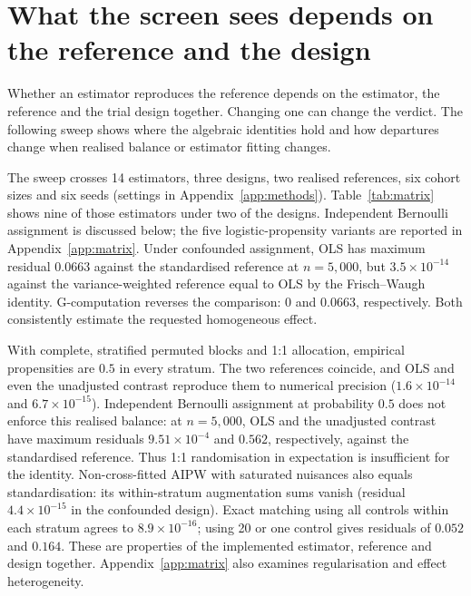\section{What the screen sees depends on the reference and the design}
\label{sec:matrix}

Whether an estimator reproduces the reference depends on the estimator, the
reference and the trial design together. Changing one can change the verdict.
The following sweep shows where the algebraic identities hold and how departures
change when realised balance or estimator fitting changes.

The sweep crosses 14 estimators, three designs, two realised references, six
cohort sizes and six seeds (settings in Appendix~\ref{app:methods}).
Table~\ref{tab:matrix} shows nine of those estimators under two of the
designs. Independent Bernoulli assignment is discussed below; the five
logistic-propensity variants are reported in Appendix~\ref{app:matrix}. Under confounded
assignment, OLS has maximum residual $0.0663$ against the standardised
reference at $n=5{,}000$, but $3.5\times10^{-14}$ against the
variance-weighted reference equal to OLS by the Frisch--Waugh identity.
G-computation reverses the comparison: $0$ and $0.0663$, respectively.
Both consistently estimate the requested homogeneous effect.

With complete, stratified permuted blocks and 1:1 allocation, empirical
propensities are $0.5$ in every stratum. The two references coincide, and
OLS and even the unadjusted contrast reproduce them to numerical precision
($1.6\times10^{-14}$ and $6.7\times10^{-15}$). Independent Bernoulli
assignment at probability $0.5$ does not enforce this realised balance:
at $n=5{,}000$, OLS and the unadjusted contrast have maximum residuals
$9.51\times10^{-4}$ and $0.562$, respectively, against the standardised
reference. Thus 1:1 randomisation in expectation is insufficient for the
identity. Non-cross-fitted AIPW with
saturated nuisances also equals standardisation: its within-stratum
augmentation sums vanish (residual $4.4\times10^{-15}$ in the confounded
design). Exact matching using all controls within each stratum agrees to
$8.9\times10^{-16}$; using 20 or one control gives residuals of $0.052$ and
$0.164$. These are properties of the implemented estimator, reference and
design together. Appendix~\ref{app:matrix} also examines regularisation and
effect heterogeneity.


